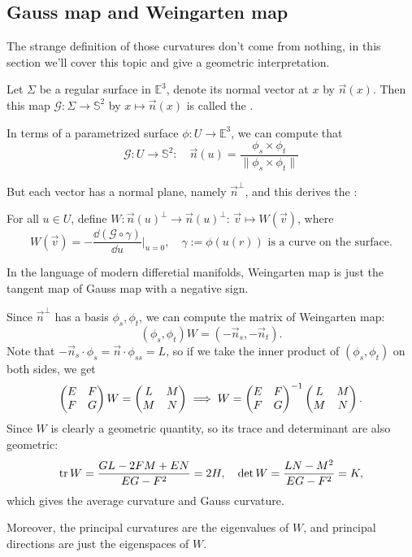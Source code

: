 \subsection{Gauss map and Weingarten map}
\label{sub:Gauss map and Weingarten map}

The strange definition of those curvatures don't
come from nothing, in this section we'll cover this topic
and give a geometric interpretation.

\begin{definition}
	Let $\Sigma$ be a regular surface in $\mathbb{E}^3$,
	denote its normal vector at $x$ by $\vec{n}(x)$.
	Then this map $\mathcal{G}: \Sigma\to \mathbb{S}^2$ by
	$x\mapsto \vec{n}(x)$ is called the .

	In terms of a parametrized surface $\phi:U\to \mathbb{E}^3$,
	we can compute that
	\[
	\mathcal{G}: U\to \mathbb{S}^2:\quad
	\vec{n}(u) = \frac{\phi_s\times \phi_t}{\lVert \phi_s\times \phi_t \rVert}
	\]
\end{definition}

But each vector has a normal plane, namely $\vec{n}^\perp$,
and this derives the :
\begin{definition}
	For all $u\in U$, define $W: \vec{n}(u)^\perp\to \vec{n}(u)^\perp$:
	$\vec{v}\mapsto W(\vec{v})$,
	where
	\[
	W(\vec{v}) = - \frac{\dd (\mathcal{G}\circ \gamma)}{\dd u}\Bigg|_{u=0},
	\quad \gamma:=\phi(u(r))\text{ is a curve on the surface}.
	\]
\end{definition}
\begin{remark}
    In the language of modern differetial manifolds,
	Weingarten map is just the tangent map of Gauss map with a negative sign.
\end{remark}

Since $\vec{n}^\perp$ has a basis $\phi_s,\phi_t$, we can compute the matrix
of Weingarten map:
 \[
(\phi_s, \phi_t)W = (-\vec{n}_s, -\vec{n}_t).
\]
Note that $-\vec{n}_s \cdot \phi_s = \vec{n}\cdot \phi_{ss} = L$,
so if we take the inner product of $(\phi_s, \phi_t)$ on both sides,
we get
 \[
\begin{pmatrix} E&F\\F&G \end{pmatrix} W = \begin{pmatrix} L&M\\M&N \end{pmatrix} \implies W = \begin{pmatrix} E&F\\F&G \end{pmatrix}^{-1}\begin{pmatrix} L&M\\M&N \end{pmatrix}.
\]
Since $W$ is clearly a geometric quantity, so its trace and determinant are
also geometric:
 \[
\operatorname{tr} W = \frac{GL - 2FM + EN}{EG - F^2} = 2H,\quad
\det W = \frac{LN - M^2}{EG - F^2} = K,
\]
which gives the average curvature and Gauss curvature.

Moreover, the principal curvatures are the eigenvalues of $W$,
and  principal directions are just the eigenspaces of $W$.

